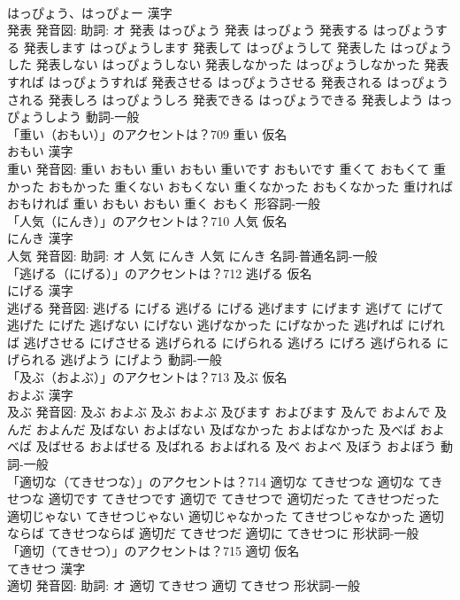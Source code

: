 \documentclass[8pt]{extreport}
\begin{document}
\begin{CJK}{UTF8}{min}
\\	はっぴょう、はっぴょー 漢字　
\\	発表 発音図: 助詞: オ	発表 はっぴょう		発表 はっぴょう 発表する はっぴょうする 発表します はっぴょうします 発表して はっぴょうして 発表した はっぴょうした 発表しない はっぴょうしない 発表しなかった はっぴょうしなかった 発表すれば はっぴょうすれば 発表させる はっぴょうさせる 発表される はっぴょうされる 発表しろ はっぴょうしろ 発表できる はっぴょうできる 発表しよう はっぴょうしよう				動詞-一般 
\\	「重い（おもい）」のアクセントは？709	重い 仮名　
\\	おもい 漢字　
\\	重い 発音図:	重い おもい		重い おもい 重いです おもいです 重くて おもくて 重かった おもかった 重くない おもくない 重くなかった おもくなかった 重ければ おもければ 重い おもい おもい 重く おもく				形容詞-一般 
\\	「人気（にんき）」のアクセントは？710	人気 仮名　
\\	にんき 漢字　
\\	人気 発音図: 助詞: オ	人気 にんき		人気 にんき				名詞-普通名詞-一般 
\\	「逃げる（にげる）」のアクセントは？712	逃げる 仮名　
\\	にげる 漢字　
\\	逃げる 発音図:	逃げる にげる		逃げる にげる 逃げます にげます 逃げて にげて 逃げた にげた 逃げない にげない 逃げなかった にげなかった 逃げれば にげれば 逃げさせる にげさせる 逃げられる にげられる 逃げろ にげろ 逃げられる にげられる 逃げよう にげよう				動詞-一般 
\\	「及ぶ（およぶ）」のアクセントは？713	及ぶ 仮名　
\\	およぶ 漢字　
\\	及ぶ 発音図:	及ぶ およぶ		及ぶ およぶ 及びます およびます 及んで およんで 及んだ およんだ 及ばない およばない 及ばなかった およばなかった 及べば およべば 及ばせる およばせる 及ばれる およばれる 及べ およべ 及ぼう およぼう				動詞-一般 
\\	「適切な（てきせつな）」のアクセントは？714		適切な てきせつな		適切な てきせつな 適切です てきせつです 適切で てきせつで 適切だった てきせつだった 適切じゃない てきせつじゃない 適切じゃなかった てきせつじゃなかった 適切ならば てきせつならば 適切だ てきせつだ 適切に てきせつに				形状詞-一般 
\\	「適切（てきせつ）」のアクセントは？715	適切 仮名　
\\	てきせつ 漢字　
\\	適切 発音図: 助詞: オ	適切 てきせつ		適切 てきせつ				形状詞-一般 

\end{CJK}
\end{document}
